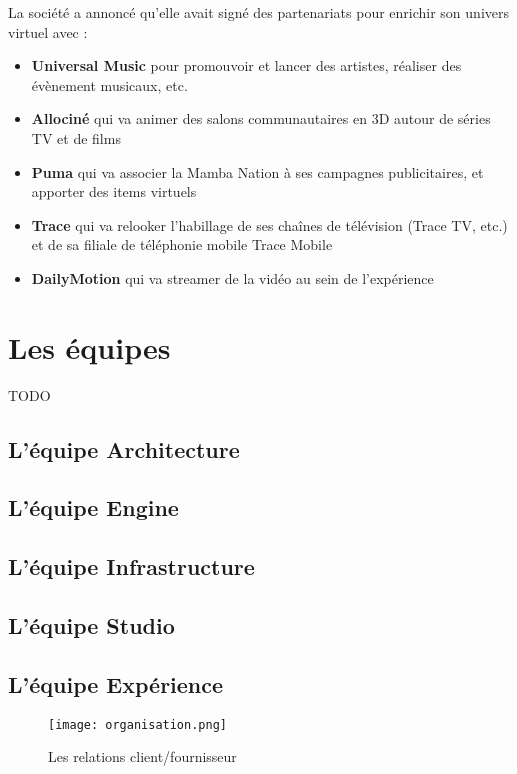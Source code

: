 La société a annoncé qu'elle avait signé des partenariats pour enrichir son
univers virtuel avec :
\begin{itemize}
  \item[\textbullet]\textbf{Universal Music} pour promouvoir et lancer des artistes,
    réaliser des évènement musicaux, etc.
  \item[\textbullet]\textbf{Allociné} qui va animer des salons communautaires en
    3D autour de séries TV et de films
  \item[\textbullet]\textbf{Puma} qui va associer la Mamba Nation à ses
    campagnes publicitaires, et apporter des items virtuels
  \item[\textbullet]\textbf{Trace} qui va relooker l'habillage de ses chaînes de
    télévision (Trace TV, etc.) et de sa filiale de téléphonie mobile Trace
    Mobile
  \item[\textbullet]\textbf{DailyMotion} qui va streamer de la vidéo au sein de
    l’expérience
\end{itemize}

\section{Les équipes}
TODO
\subsection{L'équipe Architecture}

\subsection{L'équipe Engine}

\subsection{L'équipe Infrastructure}

\subsection{L'équipe Studio}

\subsection{L'équipe Expérience}

\begin{figure}[H]
  \begin{center}
    \texttt{[image: organisation.png]}   
  \end{center}
  \caption{Les relations client/fournisseur}
\end{figure}

